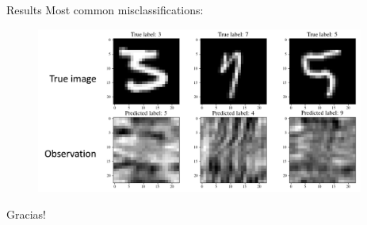 \documentclass[10pt, t]{beamer}
\begin{document}
\begin{frame}{Results}
	Most common misclassifications:
	\medskip
	\begin{figure}
		\includegraphics[width = 0.96\textwidth]{images/misclassifications.png}
	\end{figure}
\end{frame}
\begin{frame}
	\centering
	\vspace{0.3\framewidth}
	\Large{Gracias!}
\end{frame}
	
	 
\end{document}
